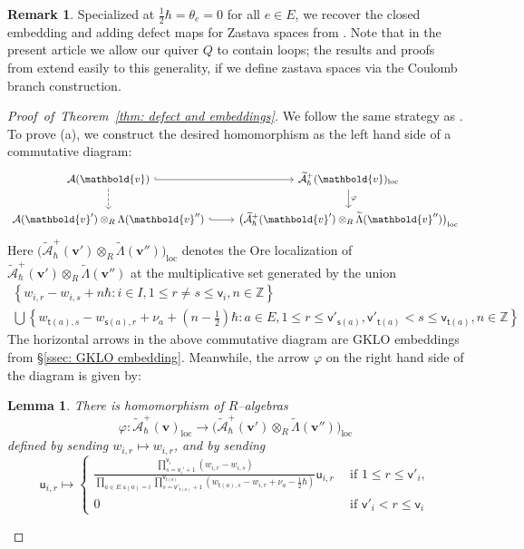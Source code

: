 \documentclass[11pt,reqno]{amsart}
\renewcommand{\mathbf}{\mathbold}
\numberwithin{equation}{section}
\newtheorem{Lemma}[equation]{Lemma}
\theoremstyle{definition}
\newtheorem{Remark}[equation]{Remark}
\newcommand{\cA}{\mathcal{A}}
\newcommand{\bv}{\mathbf{v}}
\newcommand{\ZZ}{\mathbb{Z}}
\renewcommand{\tilde}[1]{\widetilde{#1}}
\renewcommand{\bv}{\mathbf{v}} %
\newcommand{\sv}{\mathsf{v}}
\newcommand{\loc}{\mathrm{loc}} %
\newcommand{\sfu}{\mathsf{u}}
\newcommand{\source}{\mathsf{s}}
\newcommand{\target}{\mathsf{t}}
\newcommand{\vertexset}{I}
\newcommand{\arrowset}{E}
\newcommand{\GT}{\Lambda}
\newcommand{\tGT}{\widetilde{\Lambda}}
\newcommand{\base}{R}
\newcommand{\qzast}{\cA}
\begin{document}
\begin{Remark}
    Specialized at $\tfrac{1}{2}\hbar = \theta_e = 0$ for all $ e\in \arrowset$, we recover the closed embedding and adding defect maps for Zastava spaces from \cite[\S 2.5 and \S 4.4]{MW2}. Note that in the present article we allow our quiver $Q$ to contain loops; the results and proofs from \cite{MW2} extend easily to this generality, if we define zastava spaces via the Coulomb branch construction.
\end{Remark}
\begin{proof}[\mbox{Proof of Theorem \ref{thm: defect and embeddings}}]
We follow the same strategy as \cite[Theorem 2.57]{MW2}. To prove (a), we construct the desired homomorphism as the left hand side of a commutative diagram:
\begin{equation}
\label{eq: adding defect defining commutative diagram}
\begin{tikzcd}
\qzast(\bv) \ar[d,dashed] \ar[r,hook] & \tilde{\cA}_{\hbar}^+(\bv)_{\loc} \ar[d,"\varphi"] \\
\qzast(\bv') \otimes_{\base} \GT(\bv'') \ar[r,hook] & \big(\tilde{\cA}_{\hbar}^+(\bv')\otimes_{\base} \tGT(\bv'')\big)_{\loc}
\end{tikzcd}
\end{equation}
Here $\big(\tilde{\cA}_{\hbar}^+(\bv')\otimes_{\base} \tGT(\bv'')\big)_{\loc}$ denotes the Ore  localization of $\tilde{\cA}_{\hbar}^+(\bv')\otimes_{\base} \tGT(\bv'')$ at the multiplicative set generated by the union
$$
\begin{array}{c} \left\{ w_{i,r} - w_{i,s} + n \hbar : i \in \vertexset, 1 \leq r \neq s \leq \sv_i, n \in \ZZ \right\} \\
\bigcup\left\{ w_{\target(a),s} - w_{\source(a),r} + \nu_a + (n-\tfrac{1}{2})\hbar : a \in \arrowset, 1 \leq r\leq \sv'_{\source(a)}, \sv'_{\target(a)} < s \leq \sv_{\target(a)},  n \in \ZZ \right\}
\end{array}
$$
The horizontal arrows in the above commutative diagram are GKLO embeddings from \S \ref{ssec: GKLO embedding}.  Meanwhile, the arrow $\varphi$ on the right hand side of the diagram is given by:
\begin{Lemma}
\label{lem:rationalembedding}
There is homomorphism of $\base$--algebras
$$
\varphi: \tilde{\cA}_{\hbar}^+(\bv)_{\loc} \longrightarrow \big(\tilde{\cA}_{\hbar}^+(\bv')\otimes_{\base} \tGT(\bv'')\big)_{\loc}
$$
defined by sending $w_{i,r} \mapsto w_{i,r}$, and by sending
$$
\sfu_{i,r} \mapsto \left\{ \begin{array}{cl} \frac{\displaystyle{\prod_{s=\sv_i'+1}^{\sv_i}(w_{i,r}-w_{i,s})}}{\displaystyle{\prod_{a \in \arrowset: \source(a) = i} \prod_{s=\sv'_{\target(a)}+1}^{\sv_{\target(a)}} (w_{\target(a), s} - w_{i, r} + \nu_a - \tfrac{1}{2}\hbar)}} \sfu_{i,r} & \ \ \text{if } 1 \leq r \leq \sv'_i, \\ 0 & \ \ \text{if } \sv'_i < r \leq \sv_i \end{array} \right.
$$
\end{Lemma}
\end{proof}
\end{document}
